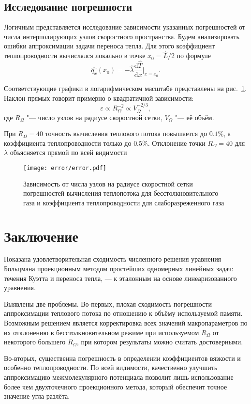 \documentclass[english,russian,a4paper,12pt]{article}
\newcommand{\D}{\mathrm{d}}
\begin{document}
\subsection{Исследование погрешности}

Логичным представляется исследование зависимости указанных погрешностей от числа интерполирующих узлов
скоростного пространства. Будем анализировать ошибки аппроксимации задачи переноса тепла.
Для этого коэффициент теплопроводности вычислялся локально в точке \(x_0=\hat L/2\) по формуле
\[ \hat{q_x}(x_0) = -\hat{\lambda}\frac{\D\hat T}{\D x}\bigg|_{x=x_0}. \]

Соответствующие графики в логарифмическом масштабе представлены на рис.~\ref{fig:error}.
Наклон прямых говорит примерно о квадратичной зависимости:
\[ \varepsilon \propto R_\Omega^{-2} \propto V_\Omega^{-2/3}, \]
где \(R_\Omega\) "--- число узлов на радиусе скоростной сетки, \(V_\Omega\) "--- её объём.

При \(R_\Omega = 40\) точность вычисления теплового потока повышается до \(0.1\%\),
а коэффициента теплопроводности только до \(0.5\%\).
Отклонение точки \(R_\Omega = 40\) для \(\lambda\) объясняется прямой по всей видимости

\begin{figure}
    \centering
    \texttt{[image: error/error.pdf]}
    \caption{
        Зависимость от числа узлов на радиусе скоростной сетки погрешностей вычисления
        теплопотока для бесстолкновительного газа и коэффициента теплопроводности для слаборазреженного газа
    }\label{fig:error}
\end{figure}

\section{Заключение}

Показана удовлетворительная сходимость численного решения уравнения Больцмана проекционным методом
простейших одномерных линейных задач: течения Куэтта и переноса тепла, --- к эталонным на основе
линеаризованного уравнения.

Выявлены две проблемы. Во-первых, плохая сходимость погрешности аппроксимации теплового потока по отношению к
объёму используемой памяти. Возможным решением является корректировка всех значений макропараметров
по их отклонению в бесстолкновительном режиме при используемом \(R_\Omega\) от некоторого большего \(R_\Omega\),
при котором результаты можно считать достоверными.

Во-вторых, существенна погрешность в определении коэффициентов вязкости и особенно теплопроводности.
По всей видимости, качественно улучшить аппроксимацию межмолекулярного потенциала позволит лишь использование
более чем двухточечного проекционного метода, который обеспечит точное значение угла разлёта.

\printbibliography
\end{document}
